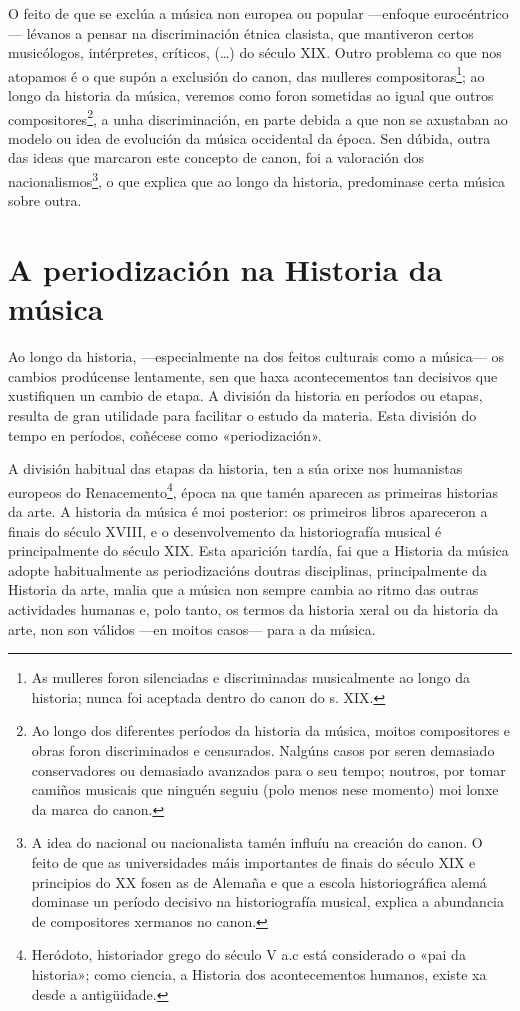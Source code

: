 \documentclass[a4paper, twoside]{templates/ociamthesis}
\begin{document}
O feito de que se exclúa a música non europea ou popular ---enfoque eurocéntrico--- lévanos a pensar na discriminación étnica clasista, que mantiveron certos musicólogos, intérpretes, críticos, (\ldots) do século XIX. Outro problema co que nos atopamos é o que supón a exclusión do canon, das mulleres compositoras\footnote{As mulleres foron silenciadas e discriminadas musicalmente ao longo da historia; nunca foi aceptada dentro do canon do s. XIX.}; ao longo da historia da música, veremos como foron sometidas ao igual que outros compositores\footnote{Ao longo dos diferentes períodos da historia da música, moitos compositores e obras foron discriminados e censurados. Nalgúns casos por seren demasiado conservadores ou demasiado avanzados para o seu tempo; noutros, por tomar camiños musicais que ninguén seguiu (polo menos nese momento) moi lonxe da marca do canon.}, a unha discriminación, en parte debida a que non se axustaban ao modelo ou idea de evolución da música occidental da época. Sen dúbida, outra das ideas que marcaron este concepto de canon, foi a valoración dos nacionalismos\footnote{A idea do nacional ou nacionalista tamén influíu na creación do canon. O feito de que as universidades máis importantes de finais do século XIX e principios do XX fosen as de Alemaña e que a escola historiográfica alemá dominase un período decisivo na historiografía musical, explica a abundancia de compositores xermanos no canon.}, o que explica que ao longo da historia, predominase certa música sobre outra.

\hypertarget{a-periodizaciuxf3n-na-historia-da-muxfasica}{%
\section*{A periodización na Historia da música}\label{a-periodizaciuxf3n-na-historia-da-muxfasica}}

Ao longo da historia, ---especialmente na dos feitos culturais como a música--- os cambios prodúcense lentamente, sen que haxa acontecementos tan decisivos que xustifiquen un cambio de etapa. A división da historia en períodos ou etapas, resulta de gran utilidade para facilitar o estudo da materia. Esta división do tempo en períodos, coñécese como «periodización».

A división habitual das etapas da historia, ten a súa orixe nos humanistas europeos do Renacemento\footnote{Heródoto, historiador grego do século V a.c está considerado o «pai da historia»; como ciencia, a Historia dos acontecementos humanos, existe xa desde a antigüidade.}, época na que tamén aparecen as primeiras historias da arte. A historia da música é moi posterior: os primeiros libros apareceron a finais do século XVIII, e o desenvolvemento da historiografía musical é principalmente do século XIX. Esta aparición tardía, fai que a Historia da música adopte habitualmente as periodizacións doutras disciplinas, principalmente da Historia da arte, malia que a música non sempre cambia ao ritmo das outras actividades humanas e, polo tanto, os termos da historia xeral ou da historia da arte, non son válidos ---en moitos casos--- para a da música.
\end{document}
